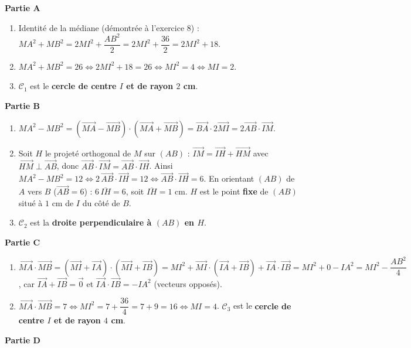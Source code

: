 \documentclass[11pt]{article}
\begin{document}
\begin{corrige}
\textbf{Partie A}
\begin{enumerate}
\item Identité de la médiane (démontrée à l'exercice 8) : $MA^2+MB^2=2MI^2+\dfrac{AB^2}{2}=2MI^2+\dfrac{36}{2}=2MI^2+18$.
\item $MA^2+MB^2=26\iff 2MI^2+18=26\iff MI^2=4\iff MI=2$.
\item $\mathcal{C}_1$ est le \textbf{cercle de centre $I$ et de rayon $2$ cm}.
\end{enumerate}
\textbf{Partie B}
\begin{enumerate}
\item $MA^2-MB^2=(\overrightarrow{MA}-\overrightarrow{MB})\cdot(\overrightarrow{MA}+\overrightarrow{MB})=\overrightarrow{BA}\cdot 2\overrightarrow{MI}=2\overrightarrow{AB}\cdot\overrightarrow{IM}$.
\item Soit $H$ le projeté orthogonal de $M$ sur $(AB)$ : $\overrightarrow{IM}=\overrightarrow{IH}+\overrightarrow{HM}$ avec $\overrightarrow{HM}\perp\overrightarrow{AB}$, donc $\overrightarrow{AB}\cdot\overrightarrow{IM}=\overrightarrow{AB}\cdot\overrightarrow{IH}$. Ainsi $MA^2-MB^2=12\iff 2\,\overrightarrow{AB}\cdot\overrightarrow{IH}=12\iff \overrightarrow{AB}\cdot\overrightarrow{IH}=6$. En orientant $(AB)$ de $A$ vers $B$ ($\overrightarrow{AB}=6$) : $6\,\overline{IH}=6$, soit $\overline{IH}=1$ cm. $H$ est le point \textbf{fixe} de $(AB)$ situé à $1$ cm de $I$ du côté de $B$.
\item $\mathcal{C}_2$ est la \textbf{droite perpendiculaire à $(AB)$ en $H$}.
\end{enumerate}
\textbf{Partie C}
\begin{enumerate}
\item $\overrightarrow{MA}\cdot\overrightarrow{MB}=(\overrightarrow{MI}+\overrightarrow{IA})\cdot(\overrightarrow{MI}+\overrightarrow{IB})=MI^2+\overrightarrow{MI}\cdot(\overrightarrow{IA}+\overrightarrow{IB})+\overrightarrow{IA}\cdot\overrightarrow{IB}=MI^2+0-IA^2=MI^2-\dfrac{AB^2}{4}$, car $\overrightarrow{IA}+\overrightarrow{IB}=\vec{0}$ et $\overrightarrow{IA}\cdot\overrightarrow{IB}=-IA^2$ (vecteurs opposés).
\item $\overrightarrow{MA}\cdot\overrightarrow{MB}=7\iff MI^2=7+\dfrac{36}{4}=7+9=16\iff MI=4$. $\mathcal{C}_3$ est le \textbf{cercle de centre $I$ et de rayon $4$ cm}.
\end{enumerate}
\textbf{Partie D}
\begin{enumerate}

\end{enumerate}
\end{corrige}
\end{document}
